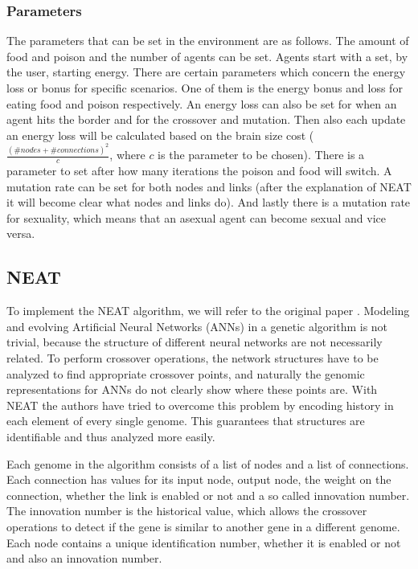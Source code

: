 \subsubsection{Parameters}

The parameters that can be set in the environment are as follows. 
The amount of food and poison and the number of agents can be set.
Agents start with a set, by the user, starting energy.
There are certain parameters which concern the energy loss or bonus for specific scenarios.
One of them is the energy bonus and loss for eating food and poison respectively.
An energy loss can also be set for when an agent hits the border and for the crossover and mutation.
Then also each update an energy loss will be calculated based on the brain size cost ($\frac{(\#nodes+\#connections)^2}{c}$, where $c$ is the parameter to be chosen).
There is a parameter to set after how many iterations the poison and food will switch.
A mutation rate can be set for both nodes and links (after the explanation of NEAT it will become clear what nodes and links do).
And lastly there is a mutation rate for sexuality, which means that an asexual agent can become sexual and vice versa.

\subsection{NEAT}

To implement the NEAT algorithm, we will refer to the original paper \cite{stanleyneat}. 
Modeling and evolving Artificial Neural Networks (ANNs) in a genetic algorithm is not trivial, because the structure of different neural networks are not necessarily related.
To perform crossover operations, the network structures have to be analyzed to find appropriate crossover points, and naturally the genomic representations for ANNs do not clearly show where these points are.
With NEAT the authors have tried to overcome this problem by encoding history in each element of every single genome.
This guarantees that structures are identifiable and thus analyzed more easily.

Each genome in the algorithm consists of a list of nodes and a list of connections.
Each connection has values for its input node, output node, the weight on the connection, whether the link is enabled or not and a so called innovation number.
The innovation number is the historical value, which allows the crossover operations to detect if the gene is similar to another gene in a different genome.
Each node contains a unique identification number, whether it is enabled or not and also an innovation number.

